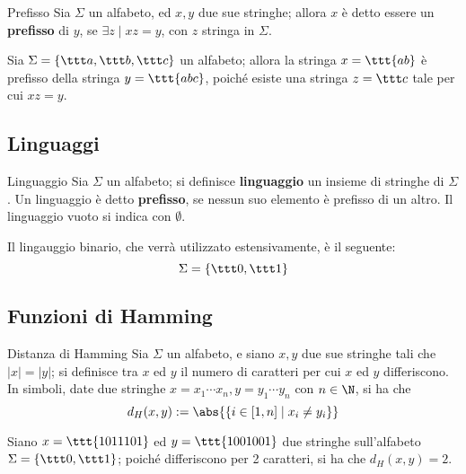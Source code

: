 \documentclass[a4paper, 12pt]{report}
\begin{document}
    \begin{frameddefn}{Prefisso}
        Sia $\Sigma$ un alfabeto, ed $x, y$ due sue stringhe; allora $x$ è detto essere un \textbf{prefisso} di $y$, se $\exists z \mid xz = y$, con $z$ stringa in $\Sigma$.
    \end{frameddefn}

    \begin{example}[Prefisso]
        Sia $\Sigma = \{\ttt a,\ttt  b,\ttt  c\}$ un alfabeto; allora la stringa $x = \ttt{ab}$ è prefisso della stringa $y = \ttt{abc}$, poiché esiste una stringa $z = \ttt c$ tale per cui $xz = y$.
    \end{example}
    
    \subsection{Linguaggi}

    \begin{frameddefn}{Linguaggio}
        Sia $\Sigma$ un alfabeto; si definisce \textbf{linguaggio} un insieme di stringhe di $\Sigma$. Un linguaggio è detto \textbf{prefisso}, se nessun suo elemento è prefisso di un altro. Il linguaggio vuoto si indica con $\emptyset$.
    \end{frameddefn}

    \begin{example}
        Il lingauggio binario, che verrà utilizzato estensivamente, è il seguente: $$\Sigma = \{ \ttt 0, \ttt 1 \}$$
    \end{example}

    \subsection{Funzioni di Hamming}

    \begin{frameddefn}{Distanza di Hamming}
        Sia $\Sigma$ un alfabeto, e siano $x, y$ due sue stringhe tali che $|x| = |y|$; si definisce  tra $x$ ed $y$ il numero di caratteri per cui $x$ ed $y$ differiscono. In simboli, date due stringhe $x = x_1 \cdots x_n, y = y_1 \cdots y_n$ con $n \in \N$, si ha che $$d_H(x, y) := \abs{\{i \in [1, n] \mid x_i \neq y_i \}}$$
    \end{frameddefn}

    \begin{example}
        Siano $x = \ttt{1011101}$ ed $y = \ttt{1001001}$ due stringhe sull'alfabeto $\Sigma = \{ \ttt 0, \ttt 1 \}$; poiché differiscono per 2 caratteri, si ha che $d_H(x, y) = 2$.
    \end{example}
\end{document}

